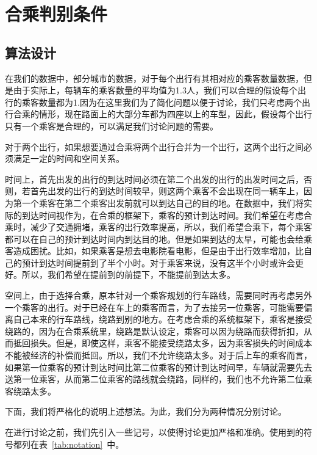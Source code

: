 \section{合乘判别条件}
\subsection{算法设计}
在我们的数据中，部分城市的数据，对于每个出行有其相对应的乘客数量数据，但是由于实际上，每辆车的乘客数量的平均值为1.3人，我们可以合理的假设每个出行的乘客数量都为1.因为在这里我们为了简化问题以便于讨论，我们只考虑两个出行合乘的情形，现在路面上的大部分车都为四座以上的车型，因此，假设每个出行只有一个乘客是合理的，可以满足我们讨论问题的需要。
\par
对于两个出行，如果想要通过合乘将两个出行合并为一个出行，这两个出行之间必须满足一定的时间和空间关系。
\par
时间上，首先出发的出行的到达时间必须在第二个出发的出行的出发时间之后，否则，若首先出发的出行的到达时间较早，则这两个乘客不会出现在同一辆车上，因为第一个乘客在第二个乘客出发前就可以到达自己的目的地。在数据中，我们将实际的到达时间视作为，在合乘的框架下，乘客的预计到达时间。我们希望在考虑合乘时，减少了交通拥堵，乘客的出行效率提高，所以，我们希望合乘下，每个乘客都可以在自己的预计到达时间内到达目的地。但是如果到达的太早，可能也会给乘客造成困扰。比如，如果乘客是想去电影院看电影，但是由于出行效率增加，比自己的预计到达时间提前到了半个小时。对于乘客来说，没有这半个小时或许会更好。所以，我们希望在提前到的前提下，不能提前到达太多。
\par
空间上，由于选择合乘，原本针对一个乘客规划的行车路线，需要同时再考虑另外一个乘客的出行。对于已经在车上的乘客而言，为了去接另一位乘客，可能需要偏离自己本来的行车路线，绕路到别的地方。在考虑合乘的系统框架下，乘客是接受绕路的，因为在合乘系统里，绕路是默认设定，乘客可以因为绕路而获得折扣，从而抵回损失。但是，即使这样，乘客不能接受绕路太多，因为乘客损失的时间成本不能被经济的补偿而抵回。所以，我们不允许绕路太多。对于后上车的乘客而言，如果第一位乘客的预计到达时间比第二位乘客的预计到达时间早，车辆就需要先去送第一位乘客，从而第二位乘客的路线就会绕路，同样的，我们也不允许第二位乘客绕路太多。
\par
下面，我们将严格化的说明上述想法。为此，我们分为两种情况分别讨论。
\par
在进行讨论之前，我们先引入一些记号，以使得讨论更加严格和准确。使用到的符号都列在表~\ref{tab:notation}~中。
